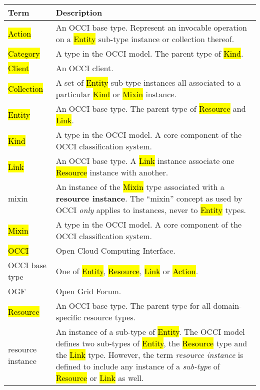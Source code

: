 \begin{tabular}{l|p{12cm}}
Term & Description \\
\hline
\hl{Action} & An OCCI base type. Represent an invocable operation on a \hl{Entity} sub-type instance or collection thereof. \\

\hl{Category} & A type in the OCCI model. The parent type of \hl{Kind}. \\

\hl{Client} & An OCCI client.\\

\hl{Collection} & A set of \hl{Entity} sub-type instances all associated to a particular \hl{Kind} or \hl{Mixin} instance. \\

\hl{Entity} & An OCCI base type. The parent type of \hl{Resource} and \hl{Link}. \\

\hl{Kind} & A type in the OCCI model. A core component of the OCCI classification system. \\

\hl{Link} & An OCCI base type. A \hl{Link} instance associate one \hl{Resource} instance with another. \\

mixin & An instance of the \hl{Mixin} type associated with a {\bf resource
 instance}. The ``mixin'' concept as used by OCCI {\em only} applies to
 instances, never to \hl{Entity} types. \\

\hl{Mixin} & A type in the OCCI model. A core component of the OCCI classification system. \\

\hl{OCCI} & Open Cloud Computing Interface. \\

OCCI base type & One of \hl{Entity}, \hl{Resource}, \hl{Link} or \hl{Action}. \\

OGF & Open Grid Forum. \\

\hl{Resource} & An OCCI base type. The parent type for all domain-specific resource types. \\

resource instance & An instance of a sub-type of \hl{Entity}. The OCCI
 model defines two sub-types of \hl{Entity}, the \hl{Resource} type and the
 \hl{Link} type. However, the term {\em resource instance} is defined to
 include any instance of a {\em sub-type} of \hl{Resource} or \hl{Link} as
 well. \\


\end{tabular}

